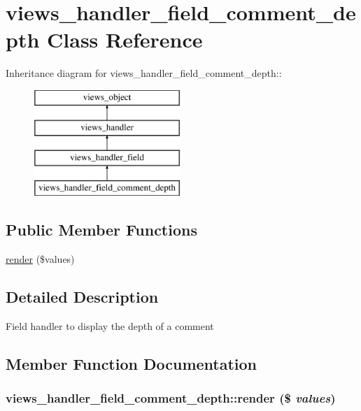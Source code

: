 \hypertarget{classviews__handler__field__comment__depth}{
\section{views\_\-handler\_\-field\_\-comment\_\-depth Class Reference}
\label{classviews__handler__field__comment__depth}
}
Inheritance diagram for views\_\-handler\_\-field\_\-comment\_\-depth::\begin{figure}[H]
\begin{center}
\leavevmode
\includegraphics[height=4cm]{classviews__handler__field__comment__depth}
\end{center}
\end{figure}
\subsection*{Public Member Functions}
\begin{CompactItemize}
\item 
\hyperlink{classviews__handler__field__comment__depth_02940dec9e78bd8e054f4c1b0f3159a9}{render} (\$values)
\end{CompactItemize}


\subsection{Detailed Description}
Field handler to display the depth of a comment 

\subsection{Member Function Documentation}
\hypertarget{classviews__handler__field__comment__depth_02940dec9e78bd8e054f4c1b0f3159a9}{
\subsubsection[{render}]{\setlength{\rightskip}{0pt plus 5cm}views\_\-handler\_\-field\_\-comment\_\-depth::render (\$ {\em values})}}
\label{classviews__handler__field__comment__depth_02940dec9e78bd8e054f4c1b0f3159a9}


